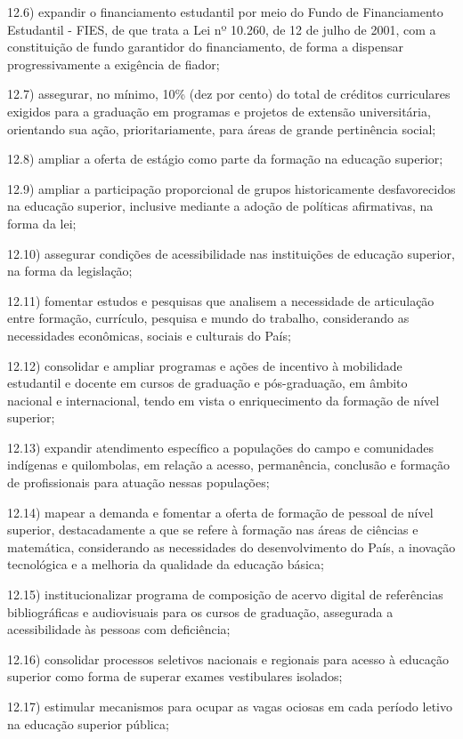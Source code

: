 \documentclass[
]{book}
\begin{document}
12.6) expandir o financiamento estudantil por meio do Fundo de Financiamento Estudantil - FIES, de que trata a Lei nº 10.260, de 12 de julho de 2001, com a constituição de fundo garantidor do financiamento, de forma a dispensar progressivamente a exigência de fiador;

12.7) assegurar, no mínimo, 10\% (dez por cento) do total de créditos curriculares exigidos para a graduação em programas e projetos de extensão universitária, orientando sua ação, prioritariamente, para áreas de grande pertinência social;

12.8) ampliar a oferta de estágio como parte da formação na educação superior;

12.9) ampliar a participação proporcional de grupos historicamente desfavorecidos na educação superior, inclusive mediante a adoção de políticas afirmativas, na forma da lei;

12.10) assegurar condições de acessibilidade nas instituições de educação superior, na forma da legislação;

12.11) fomentar estudos e pesquisas que analisem a necessidade de articulação entre formação, currículo, pesquisa e mundo do trabalho, considerando as necessidades econômicas, sociais e culturais do País;

12.12) consolidar e ampliar programas e ações de incentivo à mobilidade estudantil e docente em cursos de graduação e pós-graduação, em âmbito nacional e internacional, tendo em vista o enriquecimento da formação de nível superior;

12.13) expandir atendimento específico a populações do campo e comunidades indígenas e quilombolas, em relação a acesso, permanência, conclusão e formação de profissionais para atuação nessas populações;

12.14) mapear a demanda e fomentar a oferta de formação de pessoal de nível superior, destacadamente a que se refere à formação nas áreas de ciências e matemática, considerando as necessidades do desenvolvimento do País, a inovação tecnológica e a melhoria da qualidade da educação básica;

12.15) institucionalizar programa de composição de acervo digital de referências bibliográficas e audiovisuais para os cursos de graduação, assegurada a acessibilidade às pessoas com deficiência;

12.16) consolidar processos seletivos nacionais e regionais para acesso à educação superior como forma de superar exames vestibulares isolados;

12.17) estimular mecanismos para ocupar as vagas ociosas em cada período letivo na educação superior pública;
\end{document}
